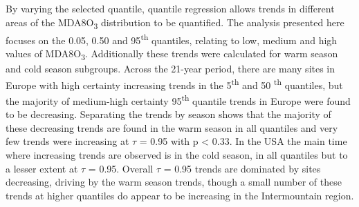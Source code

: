 \documentclass[journal abbreviation, manuscript]{copernicus}
\begin{document}
By varying the selected quantile, quantile regression allows trends in different areas of the MDA8O\textsubscript{3} distribution to be quantified. The analysis presented here focuses on the 0.05, 0.50 and 95\textsuperscript{th} quantiles, relating to low, medium and high values of MDA8O\textsubscript{3}. Additionally these trends were calculated for warm season and cold season subgroups. 
Across the 21-year period, there are many sites in Europe with high certainty increasing trends in the 5\textsuperscript{th} and 50 \textsuperscript{th} quantiles, but the majority of medium-high certainty 95\textsuperscript{th} quantile trends in Europe were found to be decreasing. Separating the trends by season shows that the majority of these decreasing trends are found in the warm season in all quantiles and very few trends were increasing at $\tau$ = 0.95 with p < 0.33. In the USA the main time where increasing trends are observed is in the cold season, in all quantiles but to a lesser extent at $\tau$ = 0.95. Overall $\tau$ = 0.95 trends are dominated by sites decreasing, driving by the warm season trends, though a small number of these trends at higher quantiles do appear to be increasing in the Intermountain region.
\end{document}
